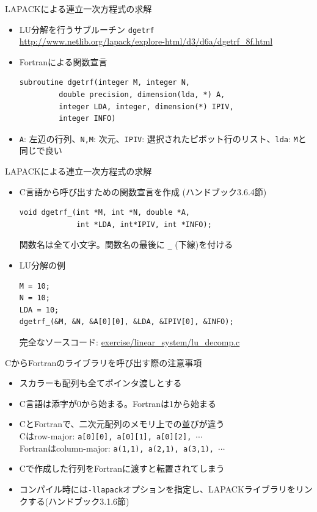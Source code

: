 \documentclass[dvipdfmx]{beamer}
\begin{document}
\begin{frame}[t,fragile]{LAPACKによる連立一次方程式の求解}
  \begin{itemize}
    \setlength{\itemsep}{1em}
  \item LU分解を行うサブルーチン {\tt dgetrf} \\
    \url{http://www.netlib.org/lapack/explore-html/d3/d6a/dgetrf_8f.html}
  \item Fortranによる関数宣言
\begin{lstlisting}
subroutine dgetrf(integer M, integer N,
         double precision, dimension(lda, *) A,
         integer LDA, integer, dimension(*) IPIV,
         integer INFO)
\end{lstlisting}
\item {\tt A}: 左辺の行列、{\tt N,M}: 次元、{\tt IPIV}: 選択されたピボット行のリスト、{\tt lda}: {\tt M}と同じで良い
  \end{itemize}
\end{frame}

\begin{frame}[t,fragile]{LAPACKによる連立一次方程式の求解}
  \begin{itemize}
    \setlength{\itemsep}{1em}
  \item C言語から呼び出すための関数宣言を作成 (ハンドブック3.6.4節)
\begin{lstlisting}
void dgetrf_(int *M, int *N, double *A,
             int *LDA, int*IPIV, int *INFO);
\end{lstlisting}
関数名は全て小文字。関数名の最後に {\tt \_} (下線)を付ける
\item LU分解の例
\begin{lstlisting}
M = 10;
N = 10;
LDA = 10;
dgetrf_(&M, &N, &A[0][0], &LDA, &IPIV[0], &INFO);
\end{lstlisting}
完全なソースコード: \href{https://github.com/todo-group/computer-experiments/blob/master/linear_system/lu_decomp.c}{exercise/linear\_system/lu\_decomp.c}
  \end{itemize}
\end{frame}

\begin{frame}[t,fragile]{CからFortranのライブラリを呼び出す際の注意事項}
  \begin{itemize}
    \setlength{\itemsep}{1em}
  \item スカラーも配列も全てポインタ渡しとする
  \item C言語は添字が0から始まる。Fortranは1から始まる
  \item CとFortranで、二次元配列のメモリ上での並びが違う \\
    Cはrow-major: {\tt a[0][0], a[0][1], a[0][2], $\cdots$} \\
    Fortranはcolumn-major: {\tt a(1,1), a(2,1), a(3,1), $\cdots$} \\
  \item Cで作成した行列をFortranに渡すと転置されてしまう
  \item コンパイル時には{\tt -llapack}オプションを指定し、LAPACKライブラリをリンクする(ハンドブック3.1.6節)
  \end{itemize}
\end{frame}
\end{document}
